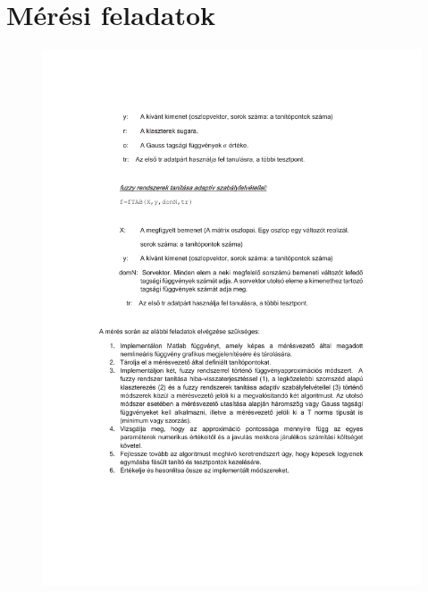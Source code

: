 \chapter{Mérési feladatok}\label{sect:LatexTools}

\begin{figure}[!ht]
	\includegraphics[trim = 30mm 60mm 30mm 153mm,clip, width=150mm,keepaspectratio]{figures/feladatok_m04.pdf}
	\label{fig:Road-of-a-char}
\end{figure}
